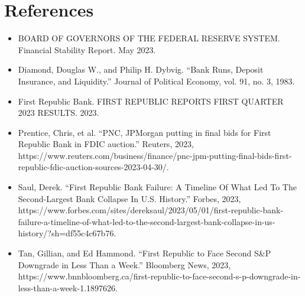 \documentclass[a4paper]{article}
\begin{document}
\section{References} \label{References}
\begin{itemize}
    \item BOARD OF GOVERNORS OF THE FEDERAL RESERVE SYSTEM. Financial Stability Report. May 2023.

    \item Diamond, Douglas W., and Philip H. Dybvig. “Bank Runs, Deposit Insurance, and Liquidity.” Journal of Political Economy, vol. 91, no. 3, 1983.

    \item First Republic Bank. FIRST REPUBLIC REPORTS FIRST QUARTER 2023 RESULTS. 2023.

    \item Prentice, Chris, et al. “PNC, JPMorgan putting in final bids for First Republic Bank in FDIC auction.” Reuters, 2023, https://www.reuters.com/business/finance/pnc-jpm-putting-final-bids-first-republic-fdic-auction-sources-2023-04-30/.

    \item Saul, Derek. “First Republic Bank Failure: A Timeline Of What Led To The Second-Largest Bank Collapse In U.S. History.” Forbes, 2023, https://www.forbes.com/sites/dereksaul/2023/05/01/first-republic-bank-failure-a-timeline-of-what-led-to-the-second-largest-bank-collapse-in-us-history/?sh=df55c4c67b76.
    \item Tan, Gillian, and Ed Hammond. “First Republic to Face Second S\&P Downgrade in Less Than a Week.” Bloomberg News, 2023, https://www.bnnbloomberg.ca/first-republic-to-face-second-s-p-downgrade-in-less-than-a-week-1.1897626.
\end{itemize}

\newpage
\end{document}
